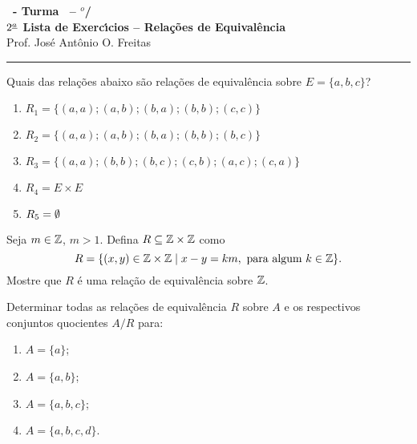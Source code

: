 \documentclass[12pt]{exam}
\begin{document}
\begin{center}
{\Large\bf \disciplina\ - Turma \turma\ -- \semestre$^{o}$/\ano} \\ \vspace{9pt} {\large\bf
  $2^{\underline{a}}$ Lista de Exerc{\'\i}cios -- Rela{\c c}{\~o}es de Equival{\^e}ncia}\\ \vspace{9pt} Prof. Jos{\'e} Ant{\^o}nio O. Freitas
\end{center}
\hrule

\vspace{.6cm}

\questao{} Quais das rela{\c c}{\~o}es abaixo s{\~a}o rela{\c c}{\~o}es de equival{\^e}ncia sobre $E = \{a,b,c\}$?
\begin{enumerate}[label={\alph*})]
    \item $R_1 = \{(a,a);(a,b);(b,a);(b,b);(c,c)\}$
    \item $R_2 = \{(a,a);(a,b);(b,a);(b,b);(b,c)\}$
    \item $R_3 = \{(a,a);(b,b);(b,c);(c,b);(a,c);(c,a)\}$
    \item $R_4 = E \times E$
    \item $R_5 = \emptyset$
\end{enumerate}

\vspace{.3cm}

\questao{} Seja $m \in \mathbb{Z}$, $m > 1$. Defina $R \subseteq \mathbb{Z}\times\mathbb{Z}$ como
\[
  R = \{(x,y) \in \mathbb{Z}\times\mathbb{Z} \mid x - y = km, \mbox{ para algum } k \in \mathbb{Z}\}.
\]
Mostre que $R$ \'e uma rela\c{c}\~ao de equival\^encia sobre $\mathbb{Z}$.

\vspace{.3cm}

\questao{} Determinar todas as rela{\c c}{\~o}es de equival{\^e}ncia
$R$ sobre $A$ e os respectivos conjuntos quocientes $A/R$ para:
\begin{enumerate}[label={\alph*})]
    \item $A=\{a\}$;
    \item $A=\{a,b\}$;
    \item $A=\{a,b,c\}$;
    \item $A=\{a,b,c,d\}$.
\end{enumerate}

\vspace{.3cm}
\end{document}
